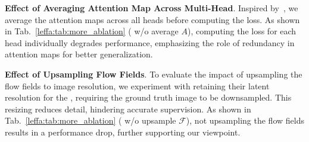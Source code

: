 

\noindent \textbf{Effect of Averaging Attention Map Across Multi-Head}.
Inspired by~\citep{darcet2023vision}, we average the attention maps across all heads before computing the \leffa{} loss.
As shown in Tab.~\ref{leffa:tab:more_ablation} (\leffa{} w/o average $A$), computing the loss for each head individually degrades performance, emphasizing the role of redundancy in attention maps for better generalization.

\noindent \textbf{Effect of Upsampling Flow Fields}.
To evaluate the impact of upsampling the flow fields to image resolution, we experiment with retaining their latent resolution for the \leffa{}, requiring the ground truth image to be downsampled.
This resizing reduces detail, hindering accurate supervision.
As shown in Tab.~\ref{leffa:tab:more_ablation} (\leffa{} w/o upsample $\mathcal{F}$), not upsampling the flow fields results in a performance drop, further supporting our viewpoint.


\begin{table}[!t]
\centering
\setlength{\tabcolsep}{0.2cm}
\caption{Ablation study for the proposed \leffa{} loss.}
\label{leffa:tab:more_ablation}
\end{table}



